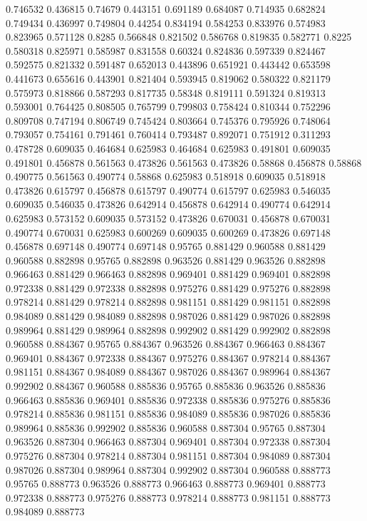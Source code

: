 0.746532 0.436815
0.74679 0.443151
0.691189 0.684087
0.714935 0.682824
0.749434 0.436997
0.749804 0.44254
0.834194 0.584253
0.833976 0.574983
0.823965 0.571128
0.8285 0.566848
0.821502 0.586768
0.819835 0.582771
0.8225 0.580318
0.825971 0.585987
0.831558 0.60324
0.824836 0.597339
0.824467 0.592575
0.821332 0.591487
0.652013 0.443896
0.651921 0.443442
0.653598 0.441673
0.655616 0.443901
0.821404 0.593945
0.819062 0.580322
0.821179 0.575973
0.818866 0.587293
0.817735 0.58348
0.819111 0.591324
0.819313 0.593001
0.764425 0.808505
0.765799 0.799803
0.758424 0.810344
0.752296 0.809708
0.747194 0.806749
0.745424 0.803664
0.745376 0.795926
0.748064 0.793057
0.754161 0.791461
0.760414 0.793487
0.892071 0.751912
0.311293 0.478728
0.609035 0.464684
0.625983 0.464684
0.625983 0.491801
0.609035 0.491801
0.456878 0.561563
0.473826 0.561563
0.473826 0.58868
0.456878 0.58868
0.490775 0.561563
0.490774 0.58868
0.625983 0.518918
0.609035 0.518918
0.473826 0.615797
0.456878 0.615797
0.490774 0.615797
0.625983 0.546035
0.609035 0.546035
0.473826 0.642914
0.456878 0.642914
0.490774 0.642914
0.625983 0.573152
0.609035 0.573152
0.473826 0.670031
0.456878 0.670031
0.490774 0.670031
0.625983 0.600269
0.609035 0.600269
0.473826 0.697148
0.456878 0.697148
0.490774 0.697148
0.95765 0.881429
0.960588 0.881429
0.960588 0.882898
0.95765 0.882898
0.963526 0.881429
0.963526 0.882898
0.966463 0.881429
0.966463 0.882898
0.969401 0.881429
0.969401 0.882898
0.972338 0.881429
0.972338 0.882898
0.975276 0.881429
0.975276 0.882898
0.978214 0.881429
0.978214 0.882898
0.981151 0.881429
0.981151 0.882898
0.984089 0.881429
0.984089 0.882898
0.987026 0.881429
0.987026 0.882898
0.989964 0.881429
0.989964 0.882898
0.992902 0.881429
0.992902 0.882898
0.960588 0.884367
0.95765 0.884367
0.963526 0.884367
0.966463 0.884367
0.969401 0.884367
0.972338 0.884367
0.975276 0.884367
0.978214 0.884367
0.981151 0.884367
0.984089 0.884367
0.987026 0.884367
0.989964 0.884367
0.992902 0.884367
0.960588 0.885836
0.95765 0.885836
0.963526 0.885836
0.966463 0.885836
0.969401 0.885836
0.972338 0.885836
0.975276 0.885836
0.978214 0.885836
0.981151 0.885836
0.984089 0.885836
0.987026 0.885836
0.989964 0.885836
0.992902 0.885836
0.960588 0.887304
0.95765 0.887304
0.963526 0.887304
0.966463 0.887304
0.969401 0.887304
0.972338 0.887304
0.975276 0.887304
0.978214 0.887304
0.981151 0.887304
0.984089 0.887304
0.987026 0.887304
0.989964 0.887304
0.992902 0.887304
0.960588 0.888773
0.95765 0.888773
0.963526 0.888773
0.966463 0.888773
0.969401 0.888773
0.972338 0.888773
0.975276 0.888773
0.978214 0.888773
0.981151 0.888773
0.984089 0.888773
